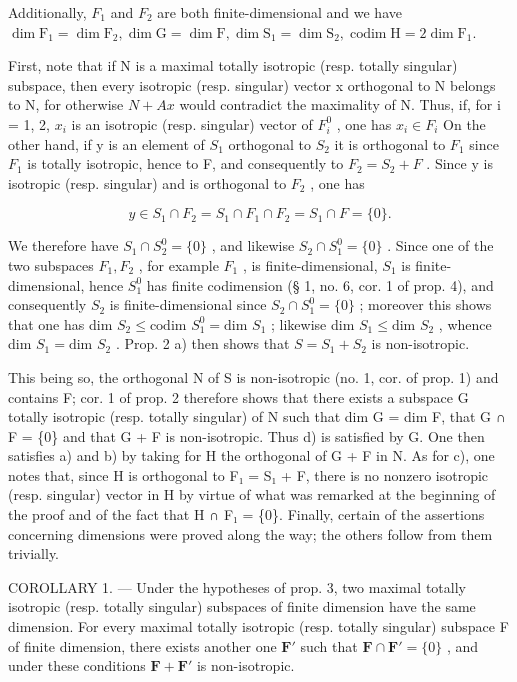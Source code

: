 Additionally, \(F_{1}\) and \(F_{2}\) are both finite-dimensional and we have \(\dim \mathrm{F}_1 = \dim \mathrm{F}_2, \dim \mathrm{G} = \dim \mathrm{F}, \dim \mathrm{S}_1 = \dim \mathrm{S}_2, \operatorname{codim} \mathrm{H} = 2 \dim \mathrm{F}_1.\)

First, note that if N is a maximal totally isotropic (resp. totally singular) subspace, then every isotropic (resp. singular) vector x orthogonal to N belongs to N, for otherwise \(N + Ax\) would contradict the maximality of N. Thus, if, for i = 1, 2, \(x_{i}\) is an isotropic (resp. singular) vector of \(F_{i}^{0}\) , one has \(x_{i} \in F_{i}\) On the other hand, if y is an element of \(S_{1}\) orthogonal to \(S_{2}\) it is orthogonal to \(F_{1}\) since \(F_{1}\) is totally isotropic, hence to F, and consequently to \(F_{2} = S_{2} + F\) . Since y is isotropic (resp. singular) and is orthogonal to \(F_{2}\) , one has

\[
y \in S _ {1} \cap F _ {2} = S _ {1} \cap F _ {1} \cap F _ {2} = S _ {1} \cap F = \{0 \}.
\]

We therefore have \(S_1 \cap S_2^0 = \{0\}\) , and likewise \(S_2 \cap S_1^0 = \{0\}\) . Since one of the two subspaces \(F_1, F_2\) , for example \(F_1\) , is finite-dimensional, \(S_1\) is finite-dimensional, hence \(S_1^0\) has finite codimension (§ 1, no. 6, cor. 1 of prop. 4), and consequently \(S_2\) is finite-dimensional since \(S_2 \cap S_1^0 = \{0\}\) ; moreover this shows that one has dim \(S_2 \leqslant \text{codim } S_1^0 = \text{dim } S_1\) ; likewise dim \(S_1 \leqslant \text{dim } S_2\) , whence dim \(S_1 = \text{dim } S_2\) . Prop. 2 a) then shows that \(S = S_1 + S_2\) is non-isotropic.

This being so, the orthogonal N of S is non-isotropic (no. 1, cor. of prop. 1) and contains F; cor. 1 of prop. 2 therefore shows that there exists a subspace G totally isotropic (resp. totally singular) of N such that dim G = dim F, that G ∩ F = \{0\} and that G + F is non-isotropic. Thus d) is satisfied by G. One then satisfies a) and b) by taking for H the orthogonal of G + F in N. As for c), one notes that, since H is orthogonal to F₁ = S₁ + F, there is no nonzero isotropic (resp. singular) vector in H by virtue of what was remarked at the beginning of the proof and of the fact that H ∩ F₁ = \{0\}. Finally, certain of the assertions concerning dimensions were proved along the way; the others follow from them trivially.

COROLLARY 1. --- Under the hypotheses of prop. 3, two maximal totally isotropic (resp. totally singular) subspaces of finite dimension have the same dimension. For every maximal totally isotropic (resp. totally singular) subspace F of finite dimension, there exists another one \(\mathbf{F}'\) such that \(\mathbf{F} \cap \mathbf{F}' = \{0\}\) , and under these conditions \(\mathbf{F} + \mathbf{F}'\) is non-isotropic.

